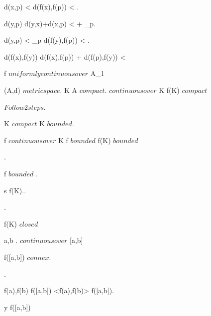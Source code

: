 {{{{{				d(x,p) <  \imp d(f(x),f(p)) < .

				d(y,p) \leq d(y,x)+d(x,p) < \delta +  \leq \delta_p.

				d(y,p) < \delta_p \imp d(f(y),f(p)) < .

				d(f(x),f(y)) \leq d(f(x),f(p)) + d(f(p),f(y)) < \eps
			}	
		}

		f $ uniformly continuous over $ A_1
	}}



	{
	{
		(A,d) $ metric space $.
		K \subset A $ compact $.
		 $ continuous over $ K
	}
	\holds
	{
		f(K) $ compact $
	}
	\demonstration
	{
		$ Follow 2 steps $.
		
		{
			K $ compact $ \imp K $ bounded $.

			f $ continuous over $ K \imp f $ bounded $ \imp f(K) $ bounded $
		}.
		
		{
			f $ bounded $ \imp {}.

			{
			}

			 \imp s \in f(K)..

			.

			f(K) $ closed $
		}
	}}



	{
	{
		a,b \in \R.
		 $ continuous over $ [a,b]
	}
	\holds
	{
		{
		}
	}
	\demonstration
	{

		\imp f([a,b]) $ connex $.

		.

		f(a),f(b) \in f([a,b]) \imp <f(a),f(b)> \subset f([a,b]).

		{
			y \in f([a,b]) \imp {}
		}
	}}
}